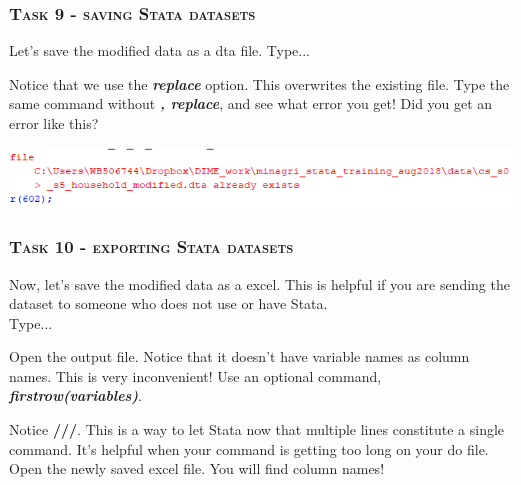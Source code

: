 \documentclass[10pt]{beamer}
\begin{document}
	\begin{frame}
		\frametitle{\textsc{Task 9 - saving Stata datasets}}		
		 Let's save the modified data as a dta file.
					\vspace{2mm} Type...
\begin{stlog}\end{stlog}
		\vspace{2mm}
		 Notice that we use the \textbf{\textit{replace}} option. 
					 This overwrites the existing file. 
					 \vspace{2mm} Type the same command without \textbf{\textit{, replace}}, 
					 and see what error you get! 
		\vspace{2mm}			 
		\onslide<3-> Did you get an error like this? 
		\begin{center}			
			\includegraphics[width=0.8\linewidth]{error_save_existing}
		\end{center}
	\end{frame}
	
	\begin{frame}
		\frametitle{\textsc{Task 10 - exporting Stata datasets}}
			
		 Now, let's save the modified data as a excel. 
					 This is helpful if you are sending the dataset to 
					 someone who does not use or have Stata. \\
					 Type...
		\vspace{2mm}
\begin{stlog}\end{stlog}
		\vspace{2mm}
		 Open the output file. 
					 Notice that it doesn't have variable names as column names.
					 This is very inconvenient!
		\onslide<3-> Use an optional command, \textbf{\textit{firstrow(variables)}}.
		\vspace{2mm}
\begin{stlog}\end{stlog}
		\vspace{2mm}
		 Notice \textbf{///}. This is a way to let Stata now that multiple lines
					  constitute a single command. It's helpful when your command is getting too
					  long on your do file.
		\onslide<5-> Open the newly saved excel file. You will find column names!
	\end{frame}
		
\end{document}
